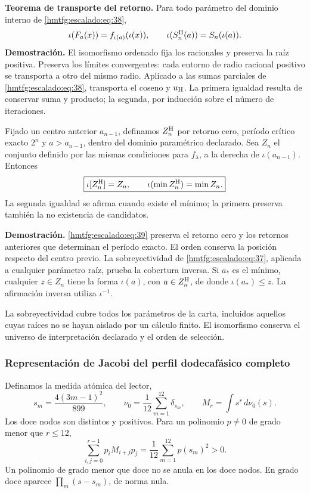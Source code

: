 \textbf{Teorema de transporte del retorno.} Para todo parámetro del dominio interno de \eqref{hmtfg:escalado:eq:38},
\begin{equation}
\iota(F_a(x))=f_{\iota(a)}(\iota(x)),\qquad
\iota(S_n^{\rm H}(a))=S_n(\iota(a)).
\label{hmtfg:escalado:eq:39}
\end{equation}
\textbf{Demostración.} El isomorfismo ordenado fija los racionales y preserva la raíz positiva. Preserva los límites convergentes: cada entorno de radio racional positivo se transporta a otro del mismo radio. Aplicado a las sumas parciales de \eqref{hmtfg:escalado:eq:38}, transporta el coseno y \(u_{\rm H}\). La primera igualdad resulta de conservar suma y producto; la segunda, por inducción sobre el número de iteraciones.

Fijado un centro anterior \(a_{n-1}\), definamos \(Z_n^{\rm H}\) por retorno cero, período crítico exacto \(2^n\) y \(a>a_{n-1}\), dentro del dominio paramétrico declarado. Sea \(Z_n\) el conjunto definido por las mismas condiciones para \(f_\lambda\), a la derecha de \(\iota(a_{n-1})\). Entonces
\begin{equation}
\boxed{\iota[Z_n^{\rm H}]=Z_n,\qquad
\iota(\min Z_n^{\rm H})=\min Z_n.}
\label{hmtfg:escalado:eq:40}
\end{equation}
La segunda igualdad se afirma cuando existe el mínimo; la primera preserva también la no existencia de candidatos.

\textbf{Demostración.} \eqref{hmtfg:escalado:eq:39} preserva el retorno cero y los retornos anteriores que determinan el período exacto. El orden conserva la posición respecto del centro previo. La sobreyectividad de \eqref{hmtfg:escalado:eq:37}, aplicada a cualquier parámetro raíz, prueba la cobertura inversa. Si \(a_*\) es el mínimo, cualquier \(z\in Z_n\) tiene la forma \(\iota(a)\), con \(a\in Z_n^{\rm H}\), de donde \(\iota(a_*)\le z\). La afirmación inversa utiliza \(\iota^{-1}\).

La sobreyectividad cubre todos los parámetros de la carta, incluidos aquellos cuyas raíces no se hayan aislado por un cálculo finito. El isomorfismo conserva el universo de interpretación declarado y el orden de selección.

\subsubsection{Representación de Jacobi del perfil dodecafásico completo}
\label{hmtfg:escalado:14.2}

Definamos la medida atómica del lector,
\begin{equation}
s_m=\frac{4(3m-1)^2}{899},\qquad
\nu_0=\frac1{12}\sum_{m=1}^{12}\delta_{s_m},\qquad
M_r=\int s^r\,d\nu_0(s).
\label{hmtfg:escalado:eq:41}
\end{equation}
Los doce nodos son distintos y positivos. Para un polinomio \(p\ne0\) de grado menor que \(r\le12\),
\begin{equation}
\sum_{i,j=0}^{r-1}p_iM_{i+j}p_j
=\frac1{12}\sum_{m=1}^{12}p(s_m)^2>0.
\label{hmtfg:escalado:eq:42}
\end{equation}
Un polinomio de grado menor que doce no se anula en los doce nodos. En grado doce aparece \(\prod_m(s-s_m)\), de norma nula.

